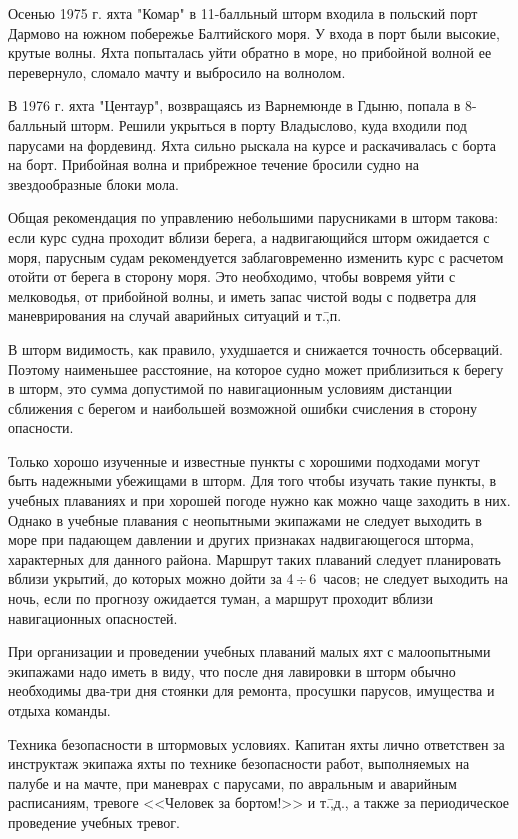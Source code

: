 \documentclass[a4paper, 12pt, twoside, final, book, russian, fittopage, cyremdash]{ncc}
\newcommand{\otdo}{\,\ensuremath{\div}\,}
\begin{document}
{\small Осенью 1975 г. яхта "Комар" в 11-балльный шторм входила в польский порт Дармово на южном побережье Балтийского моря. У входа в порт были высокие, крутые волны. Яхта попыталась уйти обратно в море, но прибойной волной ее перевернуло, сломало мачту и выбросило на волнолом.

В 1976 г. яхта "Центаур", возвращаясь из Варнемюнде в Гдыню, попала в 8-балльный шторм. Решили укрыться в порту Владыслово, куда входили под парусами на фордевинд. Яхта сильно рыскала на курсе и раскачивалась с борта на борт. Прибойная волна и прибрежное течение бросили судно на звездообразные блоки мола.}

Общая рекомендация по управлению небольшими парусниками в шторм такова: если курс судна проходит вблизи берега, а надвигающийся шторм ожидается с моря, парусным судам рекомендуется заблаговременно изменить курс с расчетом отойти от берега в сторону моря. Это необходимо, чтобы вовремя уйти с мелководья, от прибойной волны, и иметь запас чистой воды с подветра для маневрирования на случай аварийных ситуаций и т.\=,п. 

В шторм видимость, как правило, ухудшается и снижается точность обсерваций. Поэтому наименьшее расстояние, на которое судно может приблизиться к берегу в шторм, это сумма допустимой по навигационным условиям дистанции сближения с берегом и наибольшей возможной ошибки счисления в сторону опасности. 

Только хорошо изученные и известные пункты с хорошими подходами могут быть надежными убежищами в шторм. Для того чтобы изучать такие пункты, в учебных плаваниях и при хорошей погоде нужно как можно чаще заходить в них. Однако в учебные плавания с неопытными экипажами не следует выходить в море при падающем давлении и других признаках надвигающегося шторма, характерных для данного района. Маршрут таких плаваний следует планировать вблизи укрытий, до которых можно дойти за 4\otdo 6~часов; не следует выходить на ночь, если по прогнозу ожидается туман, а маршрут проходит вблизи навигационных опасностей. 

При организации и проведении учебных плаваний малых яхт с малоопытными экипажами надо иметь в виду, что после дня лавировки в шторм обычно необходимы два-три дня стоянки для ремонта, просушки парусов, имущества и отдыха команды. 

Техника безопасности в штормовых условиях. Капитан яхты лично ответствен за инструктаж экипажа яхты по технике безопасности работ, выполняемых на палубе и на мачте, при маневрах с парусами, по авральным и аварийным расписаниям, тревоге <<Человек за бортом!>> и т.\=,д., а также за периодическое проведение учебных тревог. 
\end{document}

